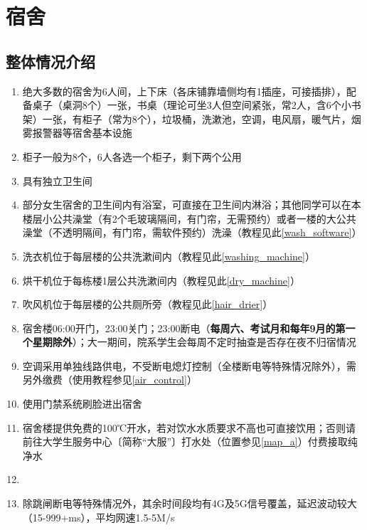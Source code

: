 \chapter[宿舍]{宿舍}

\section[整体情况介绍]{整体情况介绍}
\begin{enumerate}
      \item 绝大多数的宿舍为6人间，上下床（各床铺靠墙侧均有1插座，可接插排），配备桌子（桌洞8个）一张，书桌（理论可坐3人但空间紧张，常2人，含6个小书架）一张，有柜子（常为8个），垃圾桶，洗漱池，空调，电风扇，暖气片，烟雾报警器等宿舍基本设施
      \item 柜子\footnotemark 一般为8个，6人各选一个柜子，剩下两个公用
      \item 具有独立卫生间
      \item 部分女生宿舍的卫生间内有浴室，可直接在卫生间内淋浴；其他同学可以在本楼层小公共澡堂（有2个毛玻璃隔间，有门帘，无需预约）或者一楼的大公共澡堂（不透明隔间，有门帘，需软件预约）洗澡（教程见此\uline{\ref{wash_software}}）
      \item 洗衣机位于每层楼的公共洗漱间内（教程见此\uline{\ref{washing_machine}}）
      \item 烘干机位于每栋楼1层公共洗漱间内（教程见此\uline{\ref{dry_machine}}）
      \item 吹风机位于每层楼的公共厕所旁（教程见此\uline{\ref{hair_drier}}）
      \item 宿舍楼06:00开门，23:00关门；23:00断电（\textbf{每周六、考试月和每年9月的第一个星期除外}）；大一期间，院系学生会每周不定时抽查是否存在夜不归宿情况
      \item 空调采用单独线路供电，不受断电熄灯控制（全楼断电等特殊情况除外），需另外缴费（使用教程参见\uline{\ref{air_control}}）
      \item 使用门禁系统刷脸进出宿舍
      \item 宿舍楼提供免费的100℃开水\footnotemark，若对饮水水质要求不高也可直接饮用；否则请前往大学生服务中心〔简称“大服”〕打水处（位置参见\uline{\ref{map_a}}）付费接取纯净水
      \item \textbf{}
      \item 除跳闸断电等特殊情况外，其余时间段均有4G及5G信号覆盖，延迟波动较大（15-999+ms），平均网速1.5-5M/s
\end{enumerate}

